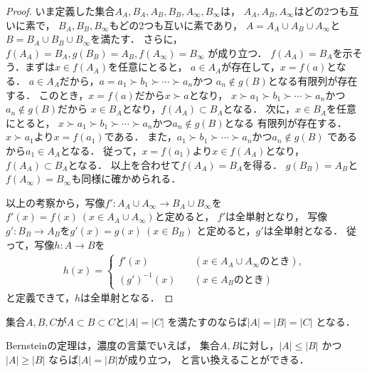 \begin{proof}
     いま定義した集合$A_A, B_A, A_B, B_B , A_{\infty} , B_{\infty}$は，
     $A_A , A_B , A_{\infty}$はどの2つも互いに素で，
     $B_A, B_B , B_{\infty}$もどの2つも互いに素であり，
     $A = A_A \cup A_B \cup A_{\infty}$と
     $B = B_A \cup B_B \cup B_{\infty}$を満たす．
     さらに，$f(A_A) = B_A ,  g(B_ B)=A_B,  f(A_{\infty})=B_{\infty}$
     が成り立つ．
     $f(A_A)=B_A$を示そう．まずは$x \in f(A_A)$を任意にとると，
     $a \in A_A$が存在して，$x=f(a)$となる．
     $a \in A_A$だから，$a=a_1 \succ b_1 \succ \cdots \succ a_n$かつ
     $a_n \notin g(B)$となる有限列が存在する．
     このとき，$x =f(a)$だから$x \succ a$となり，
     $x \succ a_1 \succ b_1 \succ \cdots \succ a_n$かつ$a_n \notin g(B)$だから
     $x \in B_A$となり，$f(A_A) \subset B_A$となる．
     次に，$x \in B_A$を任意にとると，
     $x \succ a_1 \succ b_1 \succ \cdots \succ a_n$かつ$a_n \notin g(B)$となる
     有限列が存在する．$x \succ a_1$より$x = f(a_1)$である．
     また，$a_1 \succ b_1 \succ \cdots \succ a_n$かつ$a_n \notin g(B)$
     であるから$a_1 \in A_A$となる．
     従って，$x = f(a_1)$より$x \in f(A_A)$となり，
     $f(A_A) \subset B_A$となる．
     以上を合わせて$f(A_A) = B_A$を得る．
     $g(B_B)=A_B$と$f(A_{\infty}) = B_{\infty}$も同様に確かめられる．

     以上の考察から，写像$f' : A_A \cup A_{\infty} \longrightarrow B_A \cup B_{\infty} $を
     $f'(x) = f(x) \ ( x \in A_A \cup A_{\infty})$と定めると，
     $f'$は全単射となり，
     写像$g': B_B \longrightarrow A_B$を$g'(x) = g(x) \ ( x \in B_B)$
     と定めると，$g'$は全単射となる．
     従って，写像$h:A \longrightarrow B$を
     \begin{align*}
       h(x) = \left \{ 
         \begin{aligned}
           f'(x) \qquad & ( x \in A_A \cup A_{\infty} \text{のとき} ) , \\
           \left( g' \right) ^{-1} (x) \quad & ( x \in A_B \text{のとき} ) 
         \end{aligned}
         \right.
     \end{align*}
     と定義できて，$h$は全単射となる．
   \end{proof}

   \begin{coro}
     集合$A,B,C$が$A \subset B \subset C$と$\lvert A \rvert = \lvert C \rvert$
     を満たすのならば$\lvert A \rvert = \lvert B \rvert = \lvert C \rvert$
     となる．
   \end{coro}

   Bernsteinの定理は，濃度の言葉でいえば，
   集合$A,B$に対し，$\lvert A \rvert \leq \lvert B \lvert$
   かつ$\lvert A \rvert \geq \lvert B \rvert $
   ならば$\lvert A \rvert = \lvert B \rvert$が成り立つ，
   と言い換えることができる．

